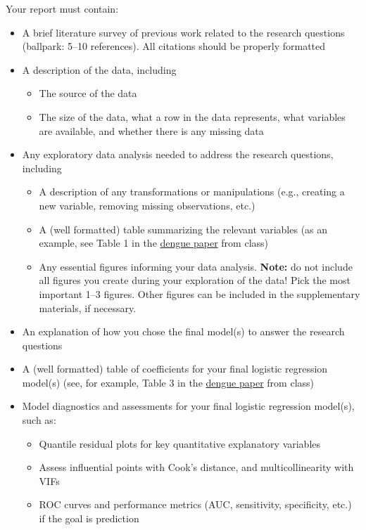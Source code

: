 \documentclass[11pt]{article}
\begin{document}
Your report must contain:
\begin{itemize}
\item A brief literature survey of previous work related to the research questions (ballpark: 5--10 references). All citations should be properly formatted 

\item A description of the data, including
\begin{itemize}
\item The source of the data
\item The size of the data, what a row in the data represents, what variables are available, and whether there is any missing data
\end{itemize}

\item Any exploratory data analysis needed to address the research questions, including
\begin{itemize}
\item A description of any transformations or manipulations (e.g., creating a new variable, removing missing observations, etc.)
\item A (well formatted) table summarizing the relevant variables (as an example, see Table 1 in the \href{https://journals.plos.org/plosntds/article?id=10.1371/journal.pntd.0003638}{dengue paper} from class)
\item Any essential figures informing your data analysis. \textbf{Note:} do not include all figures you create during your exploration of the data! Pick the most important 1--3 figures. Other figures can be included in the supplementary materials, if necessary.
\end{itemize}

\item An explanation of how you chose the final model(s) to answer the research questions

\item A (well formatted) table of coefficients for your final logistic regression model(s) (see, for example, Table 3 in the \href{https://journals.plos.org/plosntds/article?id=10.1371/journal.pntd.0003638}{dengue paper} from class)

\item Model diagnostics and assessments for your final logistic regression model(s), such as:
\begin{itemize}
\item Quantile residual plots for key quantitative explanatory variables
\item Assess influential points with Cook's distance, and multicollinearity with VIFs
\item ROC curves and performance metrics (AUC, sensitivity, specificity, etc.) if the goal is prediction
\end{itemize}


\end{itemize}
\end{document}
